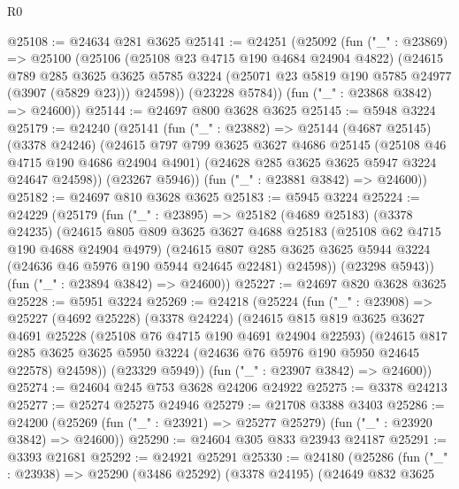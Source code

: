 \begin{lexlean}{R0}
\begin{coremodule}
@25108 := @24634 @281 @3625
@25141 := @24251
    (@25092
      (fun ("_" : @23869) =>
      @25100
        (@25106
          (@25108 @23 @4715 @190 @4684 @24904 @4822)
          (@24615
            @789
            @285
            @3625
            @3625
            @5785
            @3224
            (@25071 @23 @5819 @190 @5785 @24977 (@3907 (@5829 @23)))
            @24598))
        (@23228 @5784))
      (fun ("_" : @23868 @3842) => @24600))
@25144 := @24697 @800 @3628 @3625
@25145 := @5948 @3224
@25179 := @24240
    (@25141
      (fun ("_" : @23882) =>
      @25144
        (@4687 @25145)
        (@3378 @24246)
        (@24615
          @797
          @799
          @3625
          @3627
          @4686
          @25145
          (@25108 @46 @4715 @190 @4686 @24904 @4901)
          (@24628 @285 @3625 @3625 @5947 @3224 @24647 @24598))
        (@23267 @5946))
      (fun ("_" : @23881 @3842) => @24600))
@25182 := @24697 @810 @3628 @3625
@25183 := @5945 @3224
@25224 := @24229
    (@25179
      (fun ("_" : @23895) =>
      @25182
        (@4689 @25183)
        (@3378 @24235)
        (@24615
          @805
          @809
          @3625
          @3627
          @4688
          @25183
          (@25108 @62 @4715 @190 @4688 @24904 @4979)
          (@24615
            @807
            @285
            @3625
            @3625
            @5944
            @3224
            (@24636 @46 @5976 @190 @5944 @24645 @22481)
            @24598))
        (@23298 @5943))
      (fun ("_" : @23894 @3842) => @24600))
@25227 := @24697 @820 @3628 @3625
@25228 := @5951 @3224
@25269 := @24218
    (@25224
      (fun ("_" : @23908) =>
      @25227
        (@4692 @25228)
        (@3378 @24224)
        (@24615
          @815
          @819
          @3625
          @3627
          @4691
          @25228
          (@25108 @76 @4715 @190 @4691 @24904 @22593)
          (@24615
            @817
            @285
            @3625
            @3625
            @5950
            @3224
            (@24636 @76 @5976 @190 @5950 @24645 @22578)
            @24598))
        (@23329 @5949))
      (fun ("_" : @23907 @3842) => @24600))
@25274 := @24604 @245 @753 @3628 @24206 @24922
@25275 := @3378 @24213
@25277 := @25274 @25275 @24946
@25279 := @21708 @3388 @3403
@25286 := @24200 (@25269 (fun ("_" : @23921) => @25277 @25279) (fun ("_" : @23920 @3842) => @24600))
@25290 := @24604 @305 @833 @23943 @24187
@25291 := @3393 @21681
@25292 := @24921 @25291
@25330 := @24180
    (@25286
      (fun ("_" : @23938) =>
      @25290
        (@3486 @25292)
        (@3378 @24195)
        (@24649
          @832
          @3625

\end{coremodule}
\end{lexlean}
